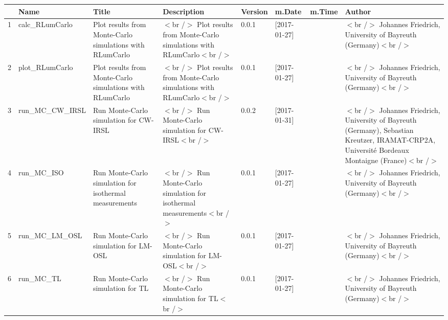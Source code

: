 \begin{table}[ht]
\centering
\begin{tabular}{rlllllll}
  \hline
 & Name & Title & Description & Version & m.Date & m.Time & Author \\ 
  \hline
1 & calc\_RLumCarlo & Plot results from Monte-Carlo simulations with RLumCarlo & $<$br /$>$ Plot results from Monte-Carlo simulations with RLumCarlo$<$br /$>$ & 0.0.1 & [2017-01-27]
 &  & $<$br /$>$ Johannes Friedrich, University of Bayreuth (Germany)$<$br /$>$ \\ 
  2 & plot\_RLumCarlo & Plot results from Monte-Carlo simulations with RLumCarlo & $<$br /$>$ Plot results from Monte-Carlo simulations with RLumCarlo$<$br /$>$ & 0.0.1 & [2017-01-27]
 &  & $<$br /$>$ Johannes Friedrich, University of Bayreuth (Germany)$<$br /$>$ \\ 
  3 & run\_MC\_CW\_IRSL & Run Monte-Carlo simulation for CW-IRSL & $<$br /$>$ Run Monte-Carlo simulation for CW-IRSL$<$br /$>$ & 0.0.2 & [2017-01-31]
 &  & $<$br /$>$ Johannes Friedrich, University of Bayreuth (Germany), Sebastian Kreutzer, IRAMAT-CRP2A, Université Bordeaux Montaigne (France)$<$br /$>$ \\ 
  4 & run\_MC\_ISO & Run Monte-Carlo simulation for isothermal measurements & $<$br /$>$ Run Monte-Carlo simulation for isothermal measurements$<$br /$>$ & 0.0.1 & [2017-01-27]
 &  & $<$br /$>$ Johannes Friedrich, University of Bayreuth (Germany)$<$br /$>$ \\ 
  5 & run\_MC\_LM\_OSL & Run Monte-Carlo simulation for LM-OSL & $<$br /$>$ Run Monte-Carlo simulation for LM-OSL$<$br /$>$ & 0.0.1 & [2017-01-27]
 &  & $<$br /$>$ Johannes Friedrich, University of Bayreuth (Germany)$<$br /$>$ \\ 
  6 & run\_MC\_TL & Run Monte-Carlo simulation for TL & $<$br /$>$ Run Monte-Carlo simulation for TL$<$br /$>$ & 0.0.1 & [2017-01-27]
 &  & $<$br /$>$ Johannes Friedrich, University of Bayreuth (Germany)$<$br /$>$ \\ 
   \hline
\end{tabular}
\end{table}

